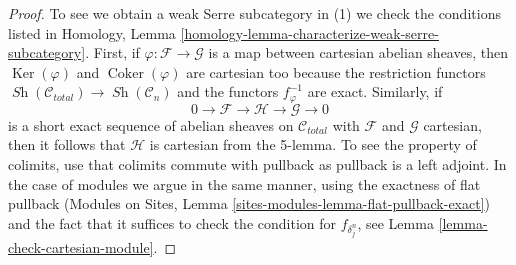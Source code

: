 \documentclass{stacks-project}
\theoremstyle{plain}
\theoremstyle{definition}
\theoremstyle{remark}
\numberwithin{equation}{subsection}
\def\Sh{\mathop{\mathit{Sh}}\nolimits}
\def\Ker{\mathop{\mathrm{Ker}}}
\def\Coker{\mathop{\mathrm{Coker}}}
\begin{document}
\begin{proof}
To see we obtain a weak Serre subcategory in (1)
we check the conditions listed in
Homology, Lemma \ref{homology-lemma-characterize-weak-serre-subcategory}.
First, if $\varphi : \mathcal{F} \to \mathcal{G}$ is a map
between cartesian abelian sheaves, then
$\Ker(\varphi)$ and $\Coker(\varphi)$ are cartesian too
because the restriction functors
$\Sh(\mathcal{C}_{total}) \to \Sh(\mathcal{C}_n)$
and the functors $f_\varphi^{-1}$ are exact.
Similarly, if
$$
0 \to \mathcal{F} \to \mathcal{H} \to \mathcal{G} \to 0
$$
is a short exact sequence of abelian sheaves on $\mathcal{C}_{total}$
with $\mathcal{F}$ and $\mathcal{G}$ cartesian, then it follows that
$\mathcal{H}$ is cartesian from the 5-lemma. To see the property of
colimits, use that colimits commute with pullback as pullback is a
left adjoint. In the case of modules
we argue in the same manner, using the exactness of flat pullback
(Modules on Sites, Lemma \ref{sites-modules-lemma-flat-pullback-exact})
and the fact that it suffices to check the condition
for $f_{\delta^n_j}$, see Lemma \ref{lemma-check-cartesian-module}.
\end{proof}
\end{document}

